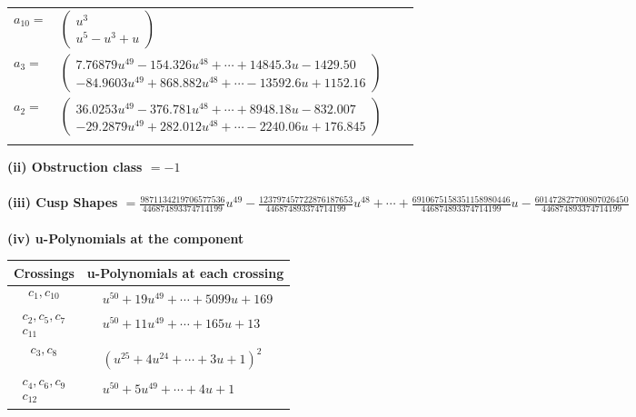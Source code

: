 \documentclass[1p]{elsarticle_modified}
\theoremstyle{definition}
\begin{document}
\begin{tabular}{m{7pt} m{180pt} m{7pt} m{180pt} }
\flushright $a_{10}=$&$\begin{pmatrix}u^3\\u^5- u^3+u\end{pmatrix}$ \\
\flushright $a_{3}=$&$\begin{pmatrix}7.76879 u^{49}-154.326 u^{48}+\cdots+14845.3 u-1429.50\\-84.9603 u^{49}+868.882 u^{48}+\cdots-13592.6 u+1152.16\end{pmatrix}$ \\
\flushright $a_{2}=$&$\begin{pmatrix}36.0253 u^{49}-376.781 u^{48}+\cdots+8948.18 u-832.007\\-29.2879 u^{49}+282.012 u^{48}+\cdots-2240.06 u+176.845\end{pmatrix}$\\&\end{tabular}
\flushleft \textbf{(ii) Obstruction class $= -1$}\\~\\
\flushleft \textbf{(iii) Cusp Shapes $= \frac{9871134219706577536}{446874893374714199} u^{49}-\frac{123797457722876187653}{446874893374714199} u^{48}+\cdots+\frac{6910675158351158980446}{446874893374714199} u-\frac{601472827700807026450}{446874893374714199}$}\\~\\
\newpage\renewcommand{\arraystretch}{1}
\flushleft \textbf{(iv) u-Polynomials at the component}\newline \\
\begin{tabular}{m{50pt}|m{274pt}}
Crossings & \hspace{64pt}u-Polynomials at each crossing \\
\hline $$\begin{aligned}c_{1},c_{10}\end{aligned}$$&$\begin{aligned}
&u^{50}+19 u^{49}+\cdots+5099 u+169
\end{aligned}$\\
\hline $$\begin{aligned}c_{2},c_{5},c_{7}\\c_{11}\end{aligned}$$&$\begin{aligned}
&u^{50}+11 u^{49}+\cdots+165 u+13
\end{aligned}$\\
\hline $$\begin{aligned}c_{3},c_{8}\end{aligned}$$&$\begin{aligned}
&(u^{25}+4 u^{24}+\cdots+3 u+1)^{2}
\end{aligned}$\\
\hline $$\begin{aligned}c_{4},c_{6},c_{9}\\c_{12}\end{aligned}$$&$\begin{aligned}
&u^{50}+5 u^{49}+\cdots+4 u+1
\end{aligned}$\\
\hline
\end{tabular}\\~\\
\end{document}
